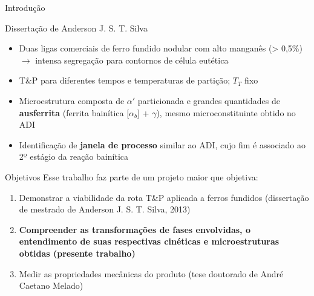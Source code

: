 \begin{frame}{Introdução}

  \begin{block}{Dissertação de Anderson J. S. T. Silva\footnotemark[1]}
    \begin{itemize}
    \item Duas ligas comerciais de ferro fundido nodular com alto manganês (> 0,5\%) $\rightarrow$ intensa segregação para contornos de célula eutética
    \item T\&P para diferentes tempos e temperaturas de partição; $T_T$ fixo
    \item Microestrutura composta de $\alpha'$ particionada e grandes quantidades de \textbf{ausferrita} (ferrita bainítica [$\alpha_b$] + $\gamma$), mesmo microconstituinte obtido no ADI
    \item Identificação de \textbf{janela de processo} similar ao ADI, cujo fim é associado ao 2º estágio da reação bainítica
    \end{itemize}

  \end{block}

\end{frame}

\begin{frame}{Objetivos}
  Esse trabalho faz parte de um projeto maior que objetiva:
  \begin{enumerate}
    \item Demonstrar a viabilidade da rota T\&P aplicada a ferros fundidos (dissertação de mestrado de Anderson J. S. T. Silva, 2013)
    \item \textbf{Compreender as transformações de fases envolvidas, o entendimento de suas respectivas cinéticas e microestruturas obtidas (presente trabalho)}
    \item Medir as propriedades mecânicas do produto (tese doutorado de André Caetano Melado)
  \end{enumerate}
\end{frame}


